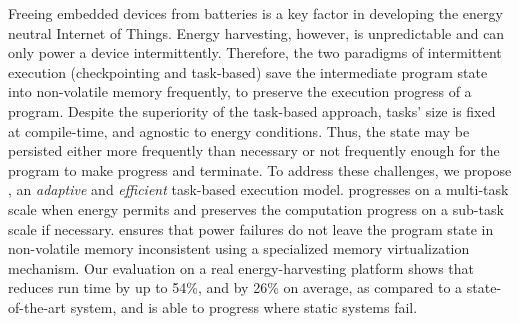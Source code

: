 Freeing embedded devices from batteries is a key factor in developing the energy neutral Internet of Things.
Energy harvesting, however, is unpredictable and can only power a device intermittently.
Therefore, the two paradigms of intermittent execution (checkpointing and task-based) save the intermediate program state into non-volatile memory frequently, to preserve the execution progress of a program.
Despite the superiority of the task-based approach, tasks' size is fixed at compile-time, and agnostic to energy conditions.
Thus,
the state may be persisted either more frequently than necessary or not frequently enough for the program to make progress and terminate.
To address these challenges, we propose \sys, an \emph{adaptive} and \emph{efficient} task-based execution model.
\sys progresses on a multi-task scale when energy permits and preserves the computation progress on a sub-task scale if necessary.
\sys ensures that power failures do not leave the program state in non-volatile memory inconsistent using a specialized memory virtualization mechanism.
Our evaluation on a real energy-harvesting platform shows that \sys reduces run time by up to 54\%, and by 26\% on average, as compared to a state-of-the-art system, and is able to progress where static systems fail.

